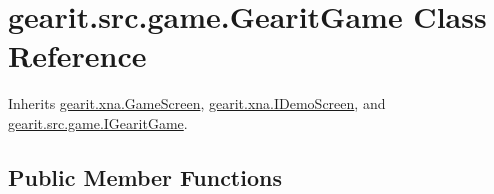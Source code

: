 \hypertarget{classgearit_1_1src_1_1game_1_1_gearit_game}{\section{gearit.\+src.\+game.\+Gearit\+Game Class Reference}
\label{classgearit_1_1src_1_1game_1_1_gearit_game}
}


Inherits \hyperlink{classgearit_1_1xna_1_1_game_screen}{gearit.\+xna.\+Game\+Screen}, \hyperlink{interfacegearit_1_1xna_1_1_i_demo_screen}{gearit.\+xna.\+I\+Demo\+Screen}, and \hyperlink{interfacegearit_1_1src_1_1game_1_1_i_gearit_game}{gearit.\+src.\+game.\+I\+Gearit\+Game}.

\subsection*{Public Member Functions}

